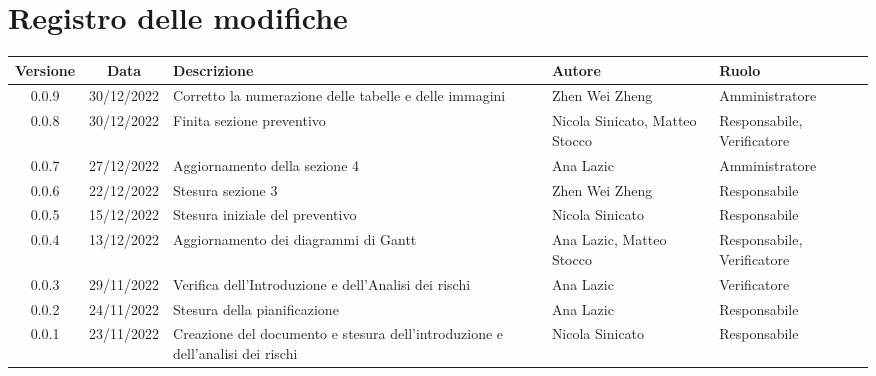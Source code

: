 \section*{Registro delle modifiche}
\begin{center}
	\renewcommand\tabularxcolumn[1]{>{\Centering}m{#1}}
	\begin{tabularx}{\textwidth}{| c | c | X | X | X |} 
		\hline
		\textbf{Versione} & \textbf{Data} & \textbf{Descrizione} & 	\textbf{Autore} & \textbf{Ruolo}\\
		\hline
		0.0.9 & 30/12/2022 & Corretto la numerazione delle tabelle e delle immagini & Zhen Wei Zheng & Amministratore\\
		\hline
		0.0.8 & 30/12/2022 & Finita sezione preventivo & Nicola Sinicato, Matteo Stocco & Responsabile, Verificatore\\
		\hline
		0.0.7 & 27/12/2022 & Aggiornamento della sezione 4 & Ana Lazic & 	Amministratore\\
		\hline
		0.0.6 & 22/12/2022 & Stesura sezione 3 & Zhen Wei Zheng & Responsabile\\
		\hline
		0.0.5 & 15/12/2022 & Stesura iniziale del preventivo & Nicola Sinicato & Responsabile\\
		\hline
		0.0.4 & 13/12/2022 & Aggiornamento dei diagrammi di Gantt & Ana Lazic, Matteo Stocco & Responsabile, Verificatore\\
		\hline
		0.0.3 & 29/11/2022 & Verifica dell'Introduzione e dell'Analisi dei rischi & Ana Lazic & Verificatore\\
		\hline
		0.0.2 & 24/11/2022 & Stesura della pianificazione & Ana Lazic & Responsabile\\
		\hline
		0.0.1 & 23/11/2022 & Creazione del documento e stesura dell'introduzione e dell'analisi dei rischi & Nicola Sinicato & Responsabile\\
		\hline
	\end{tabularx}
\end{center}
	
	


